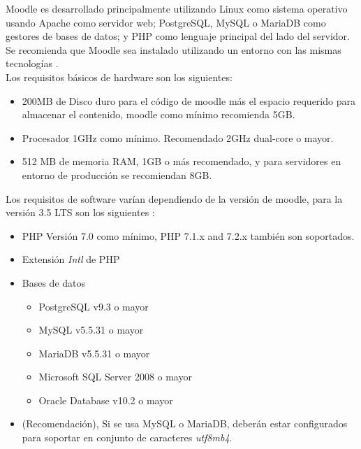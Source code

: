  Moodle es desarrollado principalmente utilizando Linux como sistema operativo usando Apache
 como servidor web; PostgreSQL, MySQL o MariaDB como gestores de bases de datos; y PHP como
 lenguaje principal del lado del servidor. Se recomienda que Moodle sea instalado utilizando
 un entorno con las mismas tecnologías \cite{moodleInstall}. \\

 \noindent Los requisitos básicos de hardware son los siguientes:

    \begin{itemize}
    \item 200MB de Disco duro para el código de moodle más el espacio requerido
          para almacenar el contenido, moodle como mínimo recomienda 5GB.

    \item Procesador 1GHz como mínimo. Recomendado 2GHz dual-core o mayor.

    \item 512 MB de memoria RAM, 1GB o más recomendado, y para servidores en entorno
          de producción se recomiendan 8GB.
    \end{itemize}

 \clearpage

 \noindent Los requisitos de software varían dependiendo de la versión de moodle, para la
 versión 3.5 LTS son los siguientes \cite{moodleReleaseNotes}:
    
    \begin{itemize}
        \item PHP Versión 7.0 como mínimo, PHP 7.1.x and 7.2.x también son soportados.
        \item Extensión {\it Intl} de PHP
        \item Bases de datos
            \begin{itemize}
            \item PostgreSQL v9.3 o mayor
            \item MySQL v5.5.31 o mayor
            \item MariaDB v5.5.31 o mayor
            \item Microsoft SQL Server 2008 o mayor
            \item Oracle Database v10.2 o mayor
            \end{itemize}
        \item[] (Recomendación), Si se usa MySQL o MariaDB, deberán estar configurados para soportar en conjunto de caracteres {\it utf8mb4}.
    \end{itemize}
    
